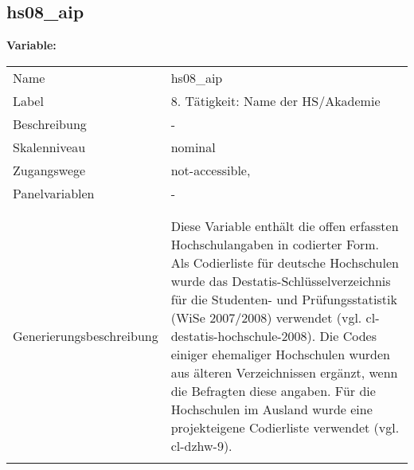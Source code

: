 	
	
	\subsection{hs08\_aip}
	\label{subSection:hs08_aip}

	\noindent\textbf{Variable:}\\
		\begin{tabular}{lL{11.3cm}}
			\label{tableVariable:hs08_aip}
			Name & hs08\_aip \\
			Label & 8. Tätigkeit: Name der HS/Akademie \\
			Beschreibung & - \\
			Skalenniveau & nominal \\
			Zugangswege &
				not-accessible,
 \\
			Panelvariablen & -
			 \\
			 \\
 \\
					Generierungsbeschreibung & Diese Variable enthält die offen erfassten Hochschulangaben in codierter Form. Als Codierliste für deutsche Hochschulen wurde das Destatis-Schlüsselverzeichnis für die Studenten- und Prüfungsstatistik (WiSe 2007/2008) verwendet (vgl. cl-destatis-hochschule-2008). Die Codes einiger ehemaliger Hochschulen wurden aus älteren Verzeichnissen ergänzt, wenn die Befragten diese angaben. Für die Hochschulen  im Ausland wurde eine projekteigene Codierliste verwendet (vgl. cl-dzhw-9). 
				 \\	
			 \\
		\end{tabular}






	
	\newpage
